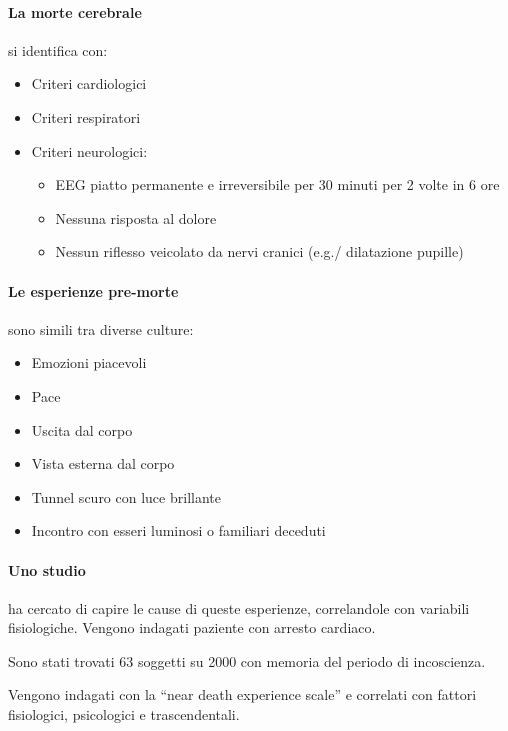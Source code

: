 \documentclass[12pt, a4paper]{article}
\begin{document}
\paragraph{La morte cerebrale} si identifica con:

\begin{itemize}
    \item Criteri cardiologici
    \item Criteri respiratori
    \item Criteri neurologici:
        \begin{itemize}
            \item EEG piatto permanente e irreversibile per 30 minuti per 2 volte in 6 ore
            \item Nessuna risposta al dolore
            \item Nessun riflesso veicolato da nervi cranici (e.g./ dilatazione pupille)
        \end{itemize}
\end{itemize}

\paragraph{Le esperienze pre-morte} sono simili tra diverse culture:

\begin{itemize}
    \item Emozioni piacevoli
    \item Pace
    \item Uscita dal corpo
    \item Vista esterna dal corpo
    \item Tunnel scuro con luce brillante
    \item Incontro con esseri luminosi o familiari deceduti
\end{itemize}

\paragraph{Uno studio} ha cercato di capire le cause di queste esperienze, correlandole con variabili fisiologiche. Vengono indagati paziente con arresto cardiaco.

Sono stati trovati 63 soggetti su 2000 con memoria del periodo di incoscienza.

Vengono indagati con la ``near death experience scale'' e correlati con fattori fisiologici, psicologici e trascendentali.
\end{document}
